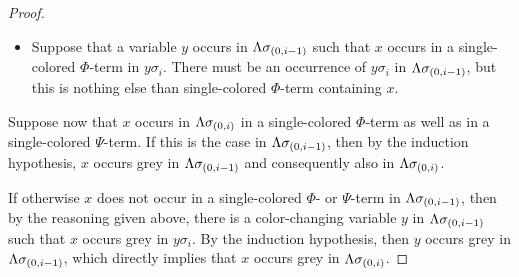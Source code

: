 \documentclass[,%
	draft=false,%
	numbers=noendperiod
	11pt,
	a4paper,
	oneside,%
	openany,
]{memoir}
\begin{document}
\begin{proof}
\begin{itemize}
		\item Suppose that a variable $y$ occurs in $\Lambda\sigma_{(0,i-1)}$ such that $x$ occurs in a single-colored $\Phi$-term in $y\sigma_i$.
			There must be an occurrence of $y\sigma_i$ in $\Lambda\sigma_{(0,i-1)}$, but this is nothing else than single-colored $\Phi$-term containing $x$.
	\end{itemize}

	Suppose now that $x$ occurs in $\Lambda\sigma_{(0,i)}$ in a single-colored $\Phi$-term as well as in a single-colored $\Psi$-term.
	If this is the case in $\Lambda\sigma_{(0,i-1)}$, then by the induction hypothesis, $x$ occurs grey in $\Lambda\sigma_{(0,i-1)}$ and consequently also in $\Lambda\sigma_{(0,i)}$.

	If otherwise $x$ does not occur in a single-colored $\Phi$- or $\Psi$-term in $\Lambda\sigma_{(0,i-1)}$, then by the reasoning given above, there is a color-changing variable $y$ in $\Lambda\sigma_{(0,i-1)}$ such that $x$ occurs grey in $y\sigma_i$. 
	By the induction hypothesis, then $y$ occurs grey in $\Lambda\sigma_{(0,i-1)}$, which directly implies that $x$ occurs grey in $\Lambda\sigma_{(0,i)}$.
\end{proof}
\end{document}
